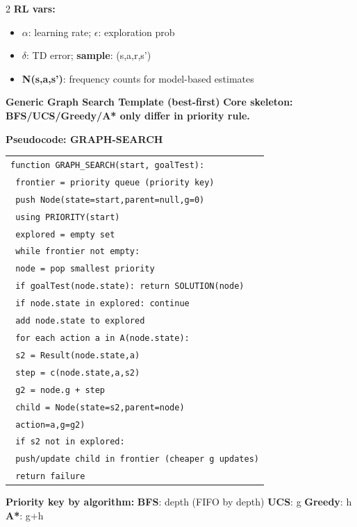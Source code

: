 \documentclass[10pt]{article}
\begin{document}
\begin{multicols*}{2}
\textbf{RL vars:}
\begin{itemize}
  \item \textbf{$\alpha$}: learning rate; \textbf{$\epsilon$}: exploration prob
  \item \textbf{$\delta$}: TD error; \textbf{sample}: (s,a,r,s')
  \item \textbf{N(s,a,s')}: frequency counts for model-based estimates
\end{itemize}

\textbf{Generic Graph Search Template (best-first)}
\textbf{Core skeleton: BFS/UCS/Greedy/A* only differ in priority rule.}

\textbf{Pseudocode: GRAPH-SEARCH}
\begin{tabular}{@{}l@{}}
\texttt{function GRAPH\_SEARCH(start, goalTest):}\\
\texttt{ frontier = priority queue (priority key)}\\
\texttt{ push Node(state=start,parent=null,g=0)}\\
\texttt{  using PRIORITY(start)}\\
\texttt{ explored = empty set}\\
\texttt{ while frontier not empty:}\\
\texttt{  node = pop smallest priority}\\
\texttt{  if goalTest(node.state): return SOLUTION(node)}\\
\texttt{  if node.state in explored: continue}\\
\texttt{  add node.state to explored}\\
\texttt{  for each action a in A(node.state):}\\
\texttt{   s2 = Result(node.state,a)}\\
\texttt{   step = c(node.state,a,s2)}\\
\texttt{   g2 = node.g + step}\\
\texttt{   child = Node(state=s2,parent=node)}\\
\texttt{    action=a,g=g2)}\\
\texttt{   if s2 not in explored:}\\
\texttt{    push/update child in frontier (cheaper g updates)}\\
\texttt{ return failure}
\end{tabular}

\textbf{Priority key by algorithm:}
\textbf{BFS}: depth (FIFO by depth) \textbullet{}
\textbf{UCS}: g \textbullet{}
\textbf{Greedy}: h \textbullet{}
\textbf{A*}: g+h


\end{multicols*}
\end{document}
